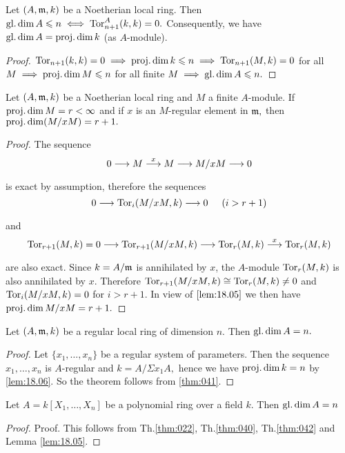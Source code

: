 \documentclass[../main]{subfiles}
\begin{document}
\begin{theorem}\label{thm:041}
Let $(A,\mathfrak{m},k)$ be a Noetherian local ring. Then \newline $\operatorname{gl. dim} A \leqslant n \iff \operatorname{Tor}_{n+1}^A(k,k)=0.$ Consequently, we have \newline $\operatorname{gl. dim} A=\operatorname{proj. dim} k$ (as $A$-module). 
\end{theorem}
\begin{proof}
$\operatorname{Tor}_{n+1}(k,k)=0 \implies \operatorname{proj. dim} k \leqslant n \implies \operatorname{Tor}_{n+1}(M,k)=0$ for all $M \implies \operatorname{proj. dim} M \leqslant n$ for all finite $M \implies \operatorname{gl. dim} A \leqslant n.$ 
\end{proof}
\begin{parlemma}\label{lem:18.06}
Let $(A,\mathfrak{m},k)$ be a Noetherian local ring and $M$ a finite $A$-module. If $\operatorname{proj. dim} M = r < \infty$ and if $x$ is an $M$-regular element in $\mathfrak{m},$ then $\operatorname{proj. dim}(M/xM)=r+1.$ 
\end{parlemma}
\begin{proof}
The sequence \[0 \varrightarrow{} M \varrightarrow{x} M \varrightarrow{} M/xM \varrightarrow{} 0\] is exact by assumption, therefore the sequences 
\[0 \varrightarrow{} \Tor_i(M/xM,k)\varrightarrow{} 0\hspace{5 mm}(i>r+1)\]
and
\[\Tor_{r+1}(M,k)=0\varrightarrow{} \Tor_{r+1}(M/xM,k)\varrightarrow{} \Tor_r(M,k)\varrightarrow{x}\Tor_r(M,k)\]
are also exact. Since $k=A/\mathfrak{m}$ is annihilated by $x$, the $A$-module $\operatorname{Tor}_r(M,k)$ is also annihilated by $x.$ Therefore $\operatorname{Tor}_{r+1}(M/xM,k)\cong \operatorname{Tor}_r(M,k)\neq 0$ and $\operatorname{Tor}_i (M/xM,k)=0$ for $i>r+1.$ In view of $\ref{lem:18.05}$ we then have \newline $\operatorname{proj. dim} M/xM=r+1.$
\end{proof}
\begin{theorem}\label{thm:042}
Let $(A,\mathfrak{m},k)$ be a regular local ring of dimension $n.$ Then \newline $\operatorname{gl. dim} A=n.$
\end{theorem}
\begin{proof}
Let $\{x_1,\dots,x_n\}$ be a regular system of parameters. Then the sequence $x_1,\dots,x_n$ is $A$-regular and $k=A/\Sigma x_1A,$ hence we have $\operatorname{proj. dim} k=n$ by \ref{lem:18.06}. So the theorem follows from \ref{thm:041}.
\end{proof}
\begin{corollary}
Let $A=k[X_1,\dots,X_n]$ be a polynomial ring over a field $k$. Then $\operatorname{gl. dim} A = n$
\end{corollary}
\begin{proof}
Proof. This follows from Th.\ref{thm:022}, Th.\ref{thm:040}, Th.\ref{thm:042} and Lemma \ref{lem:18.05}.

\end{proof}
\end{document}
